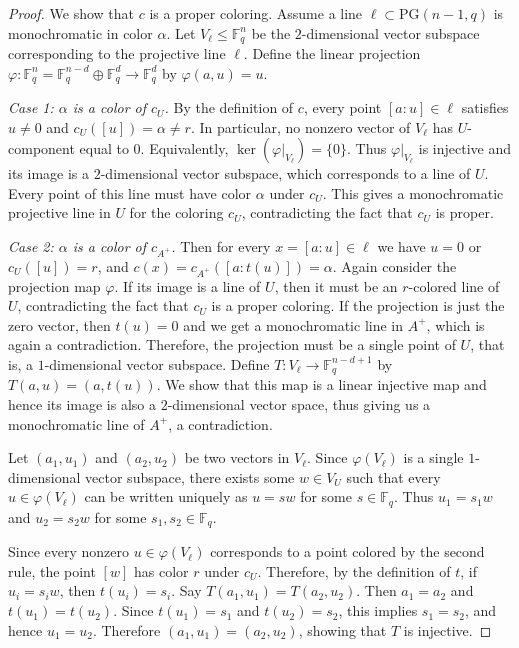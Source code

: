 \documentclass[11pt]{article}
\theoremstyle{plain}
\newcommand{\PG}{\mathrm{PG}}
\begin{document}
\begin{proof}
We show that $c$ is a proper coloring.
Assume a line $\ell\subset\PG(n-1,q)$ is monochromatic in color $\alpha$.
Let $V_\ell\le \mathbb F_q^n$ be the $2$-dimensional vector subspace corresponding to the projective line $\ell$.
Define the linear projection $\varphi:\mathbb F_q^n=\mathbb F_q^{n-d}\oplus \mathbb F_q^d\longrightarrow \mathbb F_q^d$
by $\varphi(a,u)=u.$

\emph{Case 1: $\alpha$ is a color of $c_U$.}
By the definition of $c$, every point $[a:u]\in \ell$ satisfies $u\neq 0$ and $c_U([u])=\alpha\neq r.$
In particular, no nonzero vector of $V_\ell$ has $U$-component equal to $0$. Equivalently, $\ker(\varphi|_{V_\ell})=\{0\}.$
Thus $\varphi|_{V_\ell}$ is injective and its image is a $2$-dimensional vector subspace, which corresponds to a line of $U$. 
Every point of this line must have color $\alpha$ under $c_U$.
This gives a monochromatic projective line in $U$ for the coloring $c_U$, contradicting the fact that $c_U$ is proper.

\emph{Case 2: $\alpha$ is a color of $c_{A^+}$.}
Then for every $x=[a:u]\in\ell$ we have $u=0$ or $c_U([u])=r$, 
and 
$c(x)=c_{A^+}([a:t(u)])=\alpha$.
Again consider the projection map $\varphi$. 
If its image is a line of $U$, then it must be an $r$-colored line of $U$, contradicting the fact that $c_U$ is a proper coloring. 
If the projection is just the zero vector, then $t(u) = 0$ and we get a monochromatic line in $A^+$, which is again a contradiction. 
Therefore, the projection must be a single point of $U$, that is, a $1$-dimensional vector subspace.
Define $T: V_\ell \rightarrow \mathbb{F}_q^{n - d + 1}$ by $T(a, u) = (a, t(u))$.
We show that this map is a linear injective map and hence its image is also a $2$-dimensional vector space, thus giving us a monochromatic line of $A^+$, a contradiction.

Let $(a_1,u_1)$ and $(a_2,u_2)$ be two vectors in $V_\ell$. 
Since $\varphi(V_\ell)$ is a single $1$-dimensional vector subspace, there exists some $w\in V_U$ such that every $u\in \varphi(V_\ell)$ can be written uniquely as $u=sw$ for some $s\in\mathbb F_q$.
Thus $u_1=s_1w$ and $u_2=s_2w$ for some $s_1,s_2\in\mathbb F_q$.

Since every nonzero $u\in \varphi(V_\ell)$ corresponds to a point colored by the second rule, the point $[w]$ has color $r$ under $c_U$. Therefore, by the definition of $t$, if $u_i=s_iw$, then $t(u_i)=s_i$.
Say $T(a_1,u_1)=T(a_2,u_2)$. Then $a_1=a_2$ and $t(u_1)=t(u_2)$.
Since $t(u_1)=s_1$ and $t(u_2)=s_2$, this implies $s_1=s_2$, and hence $u_1=u_2$. Therefore $(a_1,u_1)=(a_2,u_2)$, showing that $T$ is injective.


\end{proof}
\end{document}
